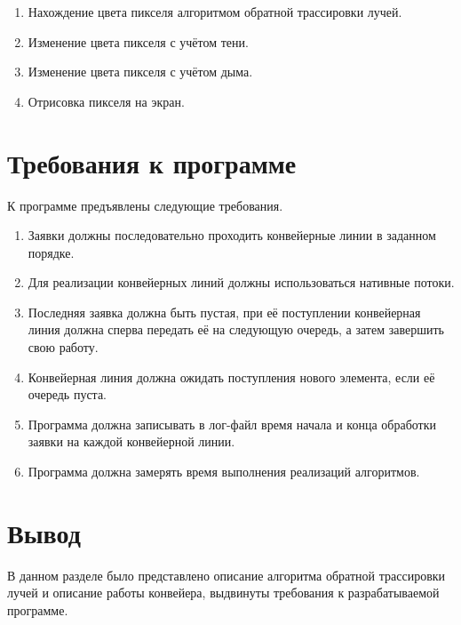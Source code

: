 \begin{enumerate}
	\item Нахождение цвета пикселя алгоритмом обратной трассировки лучей.
	\item Изменение цвета пикселя с учётом тени.
	\item Изменение цвета пикселя с учётом дыма.
	\item Отрисовка пикселя на экран.
\end{enumerate}

\section{Требования к программе}
К программе предъявлены следующие требования.
\begin{enumerate}
	\item Заявки должны последовательно проходить конвейерные линии в заданном порядке.
	\item Для реализации конвейерных линий должны использоваться нативные потоки.
	\item Последняя заявка должна быть пустая, при её поступлении конвейерная линия должна сперва передать её на следующую очередь, а затем завершить свою работу.
	\item Конвейерная линия должна ожидать поступления нового элемента, если её очередь пуста.
	\item Программа должна записывать в лог-файл время начала и конца обработки заявки на каждой конвейерной линии. 
	\item Программа должна замерять время выполнения реализаций алгоритмов. 
\end{enumerate}

\section*{Вывод}

В данном разделе было представлено описание алгоритма обратной трассировки лучей и описание работы конвейера, выдвинуты требования к разрабатываемой программе. 



